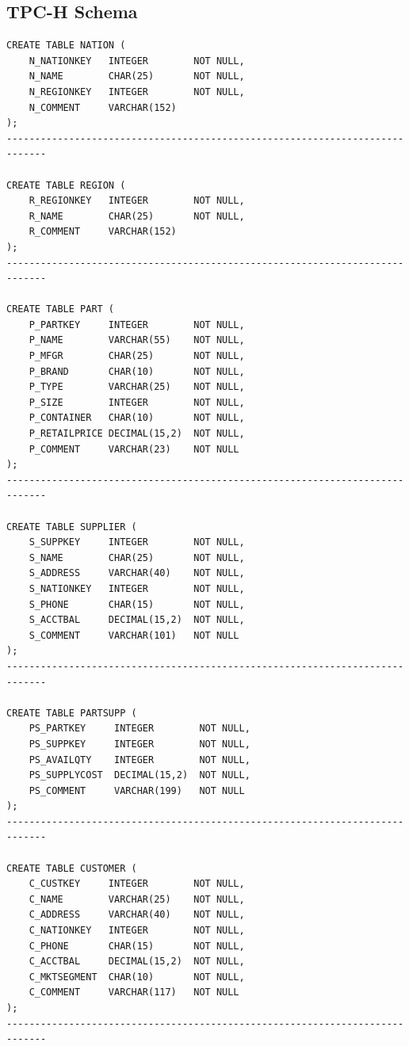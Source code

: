 \documentclass[12pt]{article}
\begin{document}
\subsection*{TPC-H Schema}
\begin{verbatim}
CREATE TABLE NATION (
    N_NATIONKEY   INTEGER        NOT NULL,
    N_NAME        CHAR(25)       NOT NULL,
    N_REGIONKEY   INTEGER        NOT NULL,
    N_COMMENT     VARCHAR(152)
);
-----------------------------------------------------------------------------

CREATE TABLE REGION (
    R_REGIONKEY   INTEGER        NOT NULL,
    R_NAME        CHAR(25)       NOT NULL,
    R_COMMENT     VARCHAR(152)
);
-----------------------------------------------------------------------------

CREATE TABLE PART (
    P_PARTKEY     INTEGER        NOT NULL,
    P_NAME        VARCHAR(55)    NOT NULL,
    P_MFGR        CHAR(25)       NOT NULL,
    P_BRAND       CHAR(10)       NOT NULL,
    P_TYPE        VARCHAR(25)    NOT NULL,
    P_SIZE        INTEGER        NOT NULL,
    P_CONTAINER   CHAR(10)       NOT NULL,
    P_RETAILPRICE DECIMAL(15,2)  NOT NULL,
    P_COMMENT     VARCHAR(23)    NOT NULL
);
-----------------------------------------------------------------------------

CREATE TABLE SUPPLIER (
    S_SUPPKEY     INTEGER        NOT NULL,
    S_NAME        CHAR(25)       NOT NULL,
    S_ADDRESS     VARCHAR(40)    NOT NULL,
    S_NATIONKEY   INTEGER        NOT NULL,
    S_PHONE       CHAR(15)       NOT NULL,
    S_ACCTBAL     DECIMAL(15,2)  NOT NULL,
    S_COMMENT     VARCHAR(101)   NOT NULL
);
-----------------------------------------------------------------------------

CREATE TABLE PARTSUPP (
    PS_PARTKEY     INTEGER        NOT NULL,
    PS_SUPPKEY     INTEGER        NOT NULL,
    PS_AVAILQTY    INTEGER        NOT NULL,
    PS_SUPPLYCOST  DECIMAL(15,2)  NOT NULL,
    PS_COMMENT     VARCHAR(199)   NOT NULL
);
-----------------------------------------------------------------------------

CREATE TABLE CUSTOMER (
    C_CUSTKEY     INTEGER        NOT NULL,
    C_NAME        VARCHAR(25)    NOT NULL,
    C_ADDRESS     VARCHAR(40)    NOT NULL,
    C_NATIONKEY   INTEGER        NOT NULL,
    C_PHONE       CHAR(15)       NOT NULL,
    C_ACCTBAL     DECIMAL(15,2)  NOT NULL,
    C_MKTSEGMENT  CHAR(10)       NOT NULL,
    C_COMMENT     VARCHAR(117)   NOT NULL
);
-----------------------------------------------------------------------------


\end{verbatim}
\end{document}
